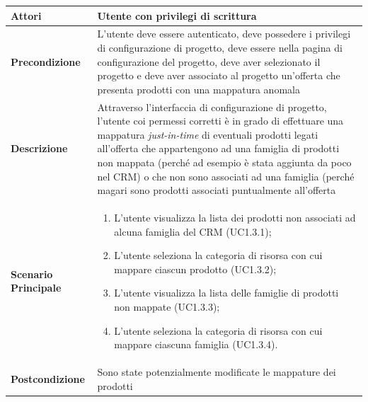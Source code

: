 	\begin{longtable}{ | p{2.7cm} | p{12cm} |}
		\hline \textbf{Attori} & Utente con privilegi di scrittura\\
		\hline \textbf{Precondizione} &  L’utente deve essere autenticato, deve possedere i privilegi di configurazione di progetto, deve essere nella pagina di configurazione del progetto, deve aver selezionato il progetto e deve aver associato al progetto un’offerta che presenta prodotti con una mappatura anomala\\
		\hline \textbf{Descrizione} & Attraverso l’interfaccia di configurazione di progetto, l’utente coi permessi corretti è in grado di effettuare una mappatura \textit{just-in-time} di eventuali prodotti legati all’offerta che appartengono ad una famiglia di prodotti non mappata (perché ad esempio è stata aggiunta da poco nel CRM) o che non sono associati ad una famiglia (perché magari sono prodotti associati puntualmente all’offerta\\ 
		\hline \textbf{Scenario Principale} & \begin{enumerate}
			\itemsep-0.5em 
			\item L’utente visualizza la lista dei prodotti non associati ad alcuna famiglia del CRM  (UC1.3.1);
			\item L’utente seleziona la categoria di risorsa con cui mappare ciascun prodotto  (UC1.3.2);
			\item L’utente visualizza la lista delle famiglie di prodotti non mappate  (UC1.3.3);
			\item L’utente seleziona la categoria di risorsa con cui mappare ciascuna famiglia  (UC1.3.4).
			
		\end{enumerate}
		\\ 
		\hline \textbf{Postcondizione} & Sono state potenzialmente modificate le mappature dei prodotti\\ 
		\hline 
	\end{longtable}
	
	\hypertarget{UC2}{}
